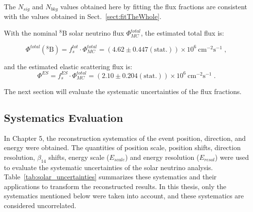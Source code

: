 The $N_{sig}$ and $N_{bkg}$ values obtained here by fitting the flux fractions are consistent with the values obtained in Sect.~\ref{sect:fitTheWhole}.

With the nominal $^8$B solar neutrino flux $\Phi^{total}_{MC}$, the estimated total flux is:

\begin{equation}
\Phi^{total}(\mathrm{^8 B})=f^{tot}_s\cdot \Phi^{total}_{MC}=(4.62 \pm 0.447\mathrm{(stat.)})\times 10^6~\mathrm{cm^{-2}s^{-1}}\; ,
\end{equation}

and the estimated elastic scattering flux is:
\begin{equation}
\Phi^{ES}=f^{ES}_s\cdot \Phi^{total}_{MC}=(2.10\pm 0.204\mathrm{(stat.)})\times 10^6~\mathrm{cm^{-2}s^{-1}}\; .
\end{equation}

The next section will evaluate the systematic uncertainties of the flux fractions.

\subsection{Systematics Evaluation}\label{sect:fluxSystem}
In Chapter 5, the reconstruction systematics of the event position, direction, and energy were obtained. The quantities of position scale, position shifts, direction resolution, $\beta_{14}$ shifts, energy scale ($E_{scale}$) and energy resolution ($E_{resol}$) were used to evaluate the systematic uncertainties of the solar neutrino analysis. Table~\ref{tab:solar_uncertainties} summarizes these systematics and their applications to transform the reconstructed results. In this thesis, only the systematics mentioned below were taken into account, and these systematics are considered uncorrelated. 

